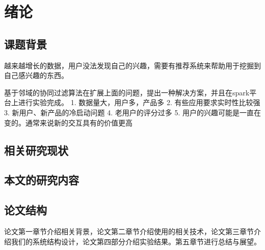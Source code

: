 \chapter{绪论}
%
%
%
%
%



\section{课题背景}

越来越增长的数据，用户没法发现自己的兴趣，需要有推荐系统来帮助用于挖掘到自己感兴趣的东西。

基于邻域的协同过滤算法在扩展上面的问题，提出一种解决方案，并且在spark平台上进行实验完成。
 1. 数据量大，用户多，产品多
 2. 有些应用要求实时性比较强
 3. 新用户、新产品的冷启动问题
 4. 老用户的评分过多
 5. 用户的兴趣可能是一直在变的。通常来说新的交互具有的价值更高
\section{相关研究现状}
\section{本文的研究内容}
\section{论文结构}
论文第一章节介绍相关背景，论文第二章节介绍使用的相关技术，论文第三章节介绍我们的系统结构设计，论文第四部分介绍实验结果。第五章节进行总结与展望。